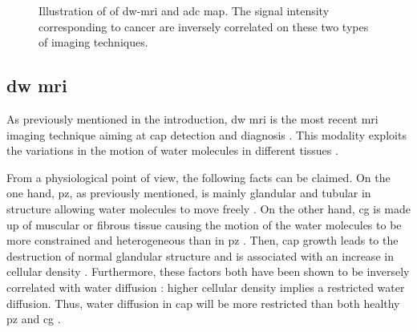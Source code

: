 \begin{figure}
\centering
	\hspace*{\fill}
	 \hfill
	\hspace*{\fill}
	\caption[Example of \ac{dw}-\ac{mri} and \ac{dce} map.]{Illustration of of \ac{dw}-\ac{mri} and \ac{adc} map. The signal intensity corresponding to cancer are inversely correlated on these two types of imaging techniques.}
	\label{fig:dwi}
\end{figure}

\subsection{\acs*{dw} \ac{mri}}\label{subsec:chp2:imaging:dw}
As previously mentioned in the introduction, \ac{dw} \ac{mri} is the most recent \ac{mri} imaging technique aiming at \ac{cap} detection and diagnosis \cite{Scheidler1999}.
This modality exploits the variations in the motion of water molecules in different tissues \cite{LeBihan1988,Koh2007}.

From a physiological point of view, the following facts can be claimed.
On the one hand, \ac{pz}, as previously mentioned, is mainly glandular and tubular in structure allowing water molecules to move freely \cite{Choi2007,Hoeks2011}.
On the other hand, \ac{cg} is made up of muscular or fibrous tissue causing the motion of the water molecules to be more constrained and heterogeneous than in \ac{pz} \cite{Hoeks2011}.
Then, \ac{cap} growth leads to the destruction of normal glandular structure and is associated with an increase in cellular density \cite{Hoeks2011,Koh2007,Somford2008}.
Furthermore, these factors both have been shown to be inversely correlated with water diffusion \cite{Koh2007,Somford2008}: higher cellular density implies a restricted water diffusion.
Thus, water diffusion in \ac{cap} will be more restricted than both healthy \ac{pz} and \ac{cg} \cite{Koh2007,Hoeks2011}.

